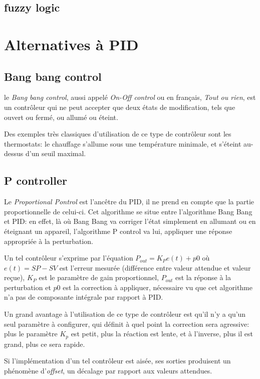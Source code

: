 \subsection{fuzzy logic}

\section{Alternatives à PID}

\subsection{Bang bang control}
le \emph{Bang bang control}, aussi appelé \emph{On-Off control} ou en français, \emph{Tout ou rien}, est un contrôleur qui ne peut accepter que deux états de modification, tels que ouvert ou fermé, ou allumé ou éteint.

Des exemples très classiques d'utilisation de ce type de contrôleur sont les thermostats: le chauffage s'allume sous une température minimale, et s'éteint au-dessus d'un seuil maximal.

\subsection{P controller}
Le \emph{Proportional Pontrol} est l'ancêtre du PID, il ne prend en compte que la partie proportionnelle de celui-ci. Cet algorithme se situe entre l'algorithme Bang Bang et PID: en effet, là où Bang Bang va corriger l'état simplement en allumant ou en éteignant un appareil, l'algorithme P control va lui, appliquer une réponse appropriée à la perturbation.

Un tel contrôleur s'exprime par l'équation $P_{out} = K_{P}e(t) + p0$ où $e(t) = SP - SV$ est l'erreur mesurée (différence entre valeur attendue et valeur reçue), $K_{P}$ est le paramètre de gain proportionnel, $P_{out}$ est la réponse à la perturbation et $p0$ est la correction à appliquer, nécessaire vu que cet algorithme n'a pas de composante intégrale par rapport à PID.

Un grand avantage à l'utilisation de ce type de contrôleur est qu'il n'y a qu'un seul paramètre à configurer, qui définit à quel point la correction sera agressive: plus le paramètre $K_{p}$ est petit, plus la réaction est lente, et à l'inverse, plus il est grand, plus ce sera rapide.

Si l'implémentation d'un tel contrôleur est aisée, ses sorties produisent un phénomène d'\emph{offset}, un décalage par rapport aux valeurs attendues.

